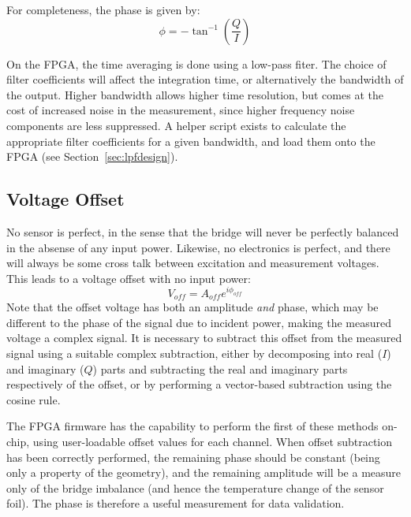 \documentclass[12pt,a4paper]{article}
\begin{document}
For completeness, the phase is given by:
\begin{equation}
  \label{equ:phi}
  \phi = -\tan^{-1}\left(\frac{Q}{I}\right)
\end{equation}

On the FPGA, the time averaging is done using a low-pass fiter. The choice of filter coefficients will affect the integration time, or alternatively the
bandwidth of the output. Higher bandwidth allows higher time resolution, but comes at the cost of increased noise in the measurement, since higher
frequency noise components are less suppressed. A helper script exists to calculate the appropriate filter coefficients for a given bandwidth, and load
them onto the FPGA (see Section~\ref{sec:lpfdesign}).

\subsection{Voltage Offset}
\label{sec:offset}
No sensor is perfect, in the sense that the bridge will never be perfectly balanced in the absense of any input power. Likewise, no electronics is perfect,
and there will always be some cross talk between excitation and measurement voltages. This leads to a voltage offset with no input power:
\begin{equation}
  \label{equ:voff}
  V_{off} = A_{off}e^{i\phi_{off}}
\end{equation}
Note that the offset voltage has both an amplitude \textit{and} phase, which may be different to the phase of the signal due to incident power, making the
measured voltage a complex signal. It is necessary to subtract this offset from the measured signal using a suitable complex subtraction, either by
decomposing into real ($I$) and imaginary ($Q$) parts and subtracting the real and imaginary parts respectively of the offset, or by performing a
vector-based subtraction using the cosine rule.

The FPGA firmware has the capability to perform the first of these methods on-chip, using user-loadable offset values for each channel. When offset
subtraction has been correctly performed, the remaining phase should be constant (being only a property of the geometry), and the remaining amplitude will
be a measure only of the bridge imbalance (and hence the temperature change of the sensor foil). The phase is therefore a useful measurement for data
validation.
\end{document}

